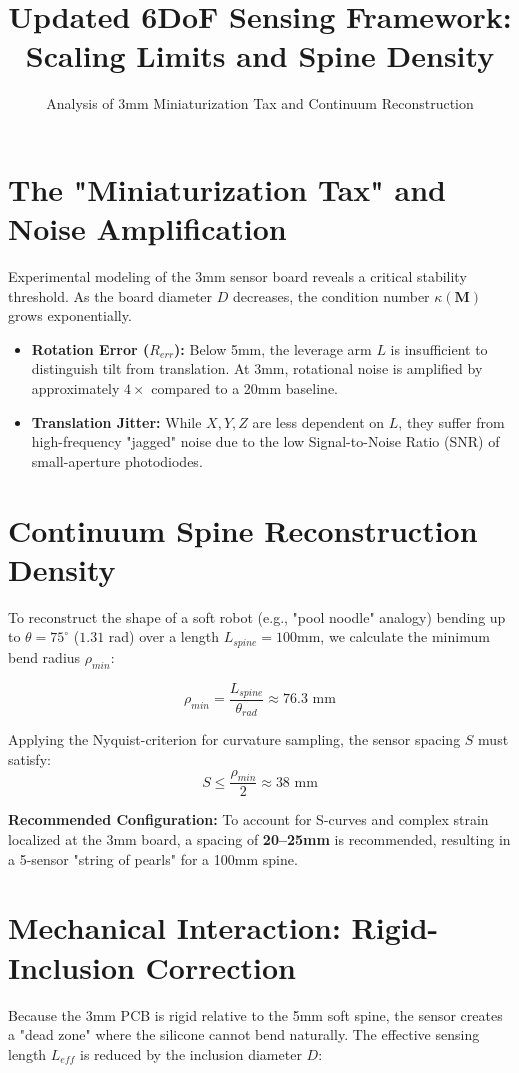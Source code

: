 \documentclass{article}
\title{Updated 6DoF Sensing Framework: Scaling Limits and Spine Density}
\author{Analysis of 3mm Miniaturization Tax and Continuum Reconstruction}
\date{}
\begin{document}
\maketitle

\section{The "Miniaturization Tax" and Noise Amplification}
Experimental modeling of the 3mm sensor board reveals a critical stability threshold. As the board diameter $D$ decreases, the condition number $\kappa(\mathbf{M})$ grows exponentially. 

\begin{itemize}
    \item \textbf{Rotation Error ($R_{err}$):} Below 5mm, the leverage arm $L$ is insufficient to distinguish tilt from translation. At 3mm, rotational noise is amplified by approximately $4\times$ compared to a 20mm baseline.
    \item \textbf{Translation Jitter:} While $X, Y, Z$ are less dependent on $L$, they suffer from high-frequency "jagged" noise due to the low Signal-to-Noise Ratio (SNR) of small-aperture photodiodes.
\end{itemize}

\section{Continuum Spine Reconstruction Density}
To reconstruct the shape of a soft robot (e.g., "pool noodle" analogy) bending up to $\theta = 75^\circ$ ($1.31$ rad) over a length $L_{spine} = 100$mm, we calculate the minimum bend radius $\rho_{min}$:

\begin{equation}
\rho_{min} = \frac{L_{spine}}{\theta_{rad}} \approx 76.3\text{ mm}
\end{equation}

Applying the Nyquist-criterion for curvature sampling, the sensor spacing $S$ must satisfy:
\begin{equation}
S \leq \frac{\rho_{min}}{2} \approx 38\text{ mm}
\end{equation}

\textbf{Recommended Configuration:} To account for S-curves and complex strain localized at the 3mm board, a spacing of \textbf{20--25mm} is recommended, resulting in a 5-sensor "string of pearls" for a 100mm spine.

\section{Mechanical Interaction: Rigid-Inclusion Correction}
Because the 3mm PCB is rigid relative to the 5mm soft spine, the sensor creates a "dead zone" where the silicone cannot bend naturally. The effective sensing length $L_{eff}$ is reduced by the inclusion diameter $D$:
\end{document}
